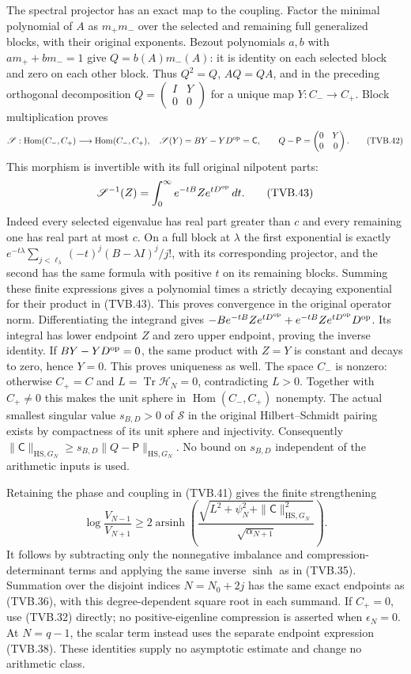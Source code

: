 \documentclass[11pt]{article}
\newcommand{\tr}{\operatorname{Tr}}
\begin{document}
The spectral projector has an exact map to the coupling.
Factor the minimal polynomial of $A$ as $m_+m_-$ over the
selected and remaining full generalized blocks, with their
original exponents. Bezout polynomials $a,b$ with
$am_++bm_-=1$ give $Q=b(A)m_-(A)$: it is identity on each
selected block and zero on each other block. Thus $Q^2=Q$,
$AQ=QA$, and in the preceding orthogonal decomposition
$Q=\left(\begin{smallmatrix}I&Y\\0&0\end{smallmatrix}\right)$
for a unique map $Y:C_-\to C_+$. Block multiplication proves
\[
 \mathscr S:\operatorname{Hom}(C_-,C_+)
       \longrightarrow\operatorname{Hom}(C_-,C_+),\quad
 \mathscr S(Y)=BY-YD^{\rm op}=\mathsf C,
 \qquad Q-\mathsf P=
 \begin{pmatrix}0&Y\\0&0\end{pmatrix}.
 \tag{TVB.42}
\]
This morphism is invertible with its full original nilpotent parts:
\[
 \mathscr S^{-1}(Z)=\int_0^\infty e^{-tB}Ze^{tD^{\rm op}}\,dt.
 \tag{TVB.43}
\]
Indeed every selected eigenvalue has real part greater than $c$
and every remaining one has real part at most $c$. On a full
block at $\lambda$ the first exponential is exactly
$e^{-t\lambda}\sum_{j<\ell_\lambda}(-t)^j(B-\lambda I)^j/j!$,
with its corresponding projector, and the second has the same
formula with positive $t$ on its remaining blocks. Summing these
finite expressions gives a polynomial times a strictly decaying
exponential for their product in (TVB.43). This proves convergence
in the original operator norm. Differentiating the integrand gives
$-B e^{-tB}Ze^{tD^{\rm op}}+e^{-tB}Ze^{tD^{\rm op}}D^{\rm op}$.
Its integral has lower endpoint $Z$ and zero upper endpoint,
proving the inverse identity. If $BY-YD^{\rm op}=0$, the same
product with $Z=Y$ is constant and decays to zero, hence $Y=0$.
This proves uniqueness as well. The space $C_-$ is nonzero:
otherwise $C_+=C$ and $L=\tr\mathcal H_N=0$, contradicting $L>0$.
Together with $C_+\ne0$ this makes the unit sphere in
$\operatorname{Hom}(C_-,C_+)$ nonempty. The actual smallest singular
value $s_{B,D}>0$ of $\mathscr S$ in the original Hilbert--Schmidt
pairing exists by compactness of its unit sphere and injectivity.
Consequently
$\|\mathsf C\|_{\mathrm{HS},G_N}
 \ge s_{B,D}\|Q-\mathsf P\|_{\mathrm{HS},G_N}$.
No bound on $s_{B,D}$ independent of the arithmetic inputs is used.

Retaining the phase and coupling in (TVB.41) gives the finite
strengthening
\[
 \log\frac{V_{N-1}}{V_{N+1}}
 \ge2\operatorname{arsinh}\left(
 \frac{\sqrt{L^2+\psi_N^2+\|\mathsf C\|_{\mathrm{HS},G_N}^2}}
      {\sqrt{\alpha_{N+1}}}\right).
 \tag{TVB.44}
\]
It follows by subtracting only the nonnegative imbalance and
compression-determinant terms and applying the same inverse
$\sinh$ as in (TVB.35). Summation over the disjoint indices
$N=N_0+2j$ has the same exact endpoints as (TVB.36), with this
degree-dependent square root in each summand. If $C_+=0$, use
(TVB.32) directly; no positive-eigenline compression is asserted
when $\epsilon_N=0$. At $N=q-1$, the scalar term instead uses
the separate endpoint expression (TVB.38). These identities supply
no asymptotic estimate and change no arithmetic class.
\end{document}

